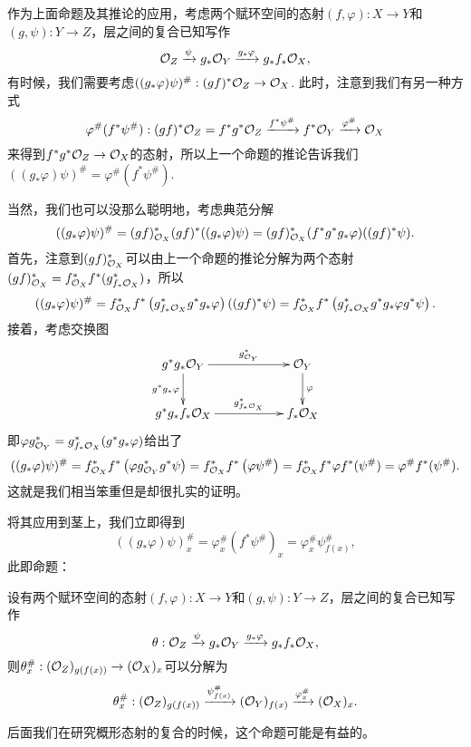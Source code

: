 \begin{para}
	作为上面命题及其推论的应用，考虑两个赋环空间的态射$(f,\varphi):X\to Y$和$(g,\psi):Y\to Z$，层之间的复合已知写作
	\[
		\mathcal{O}_Z\xrightarrow{\psi} g_*\mathcal{O}_Y\xrightarrow{g_*\varphi} g_*f_*\mathcal{O}_X,
	\]
	有时候，我们需要考虑$((g_*\varphi)\psi)^\#:(gf)^*\mathcal{O}_Z\to \mathcal{O}_X$. 此时，注意到我们有另一种方式
	\[
		\varphi^\#(f^*\psi^\#):(gf)^*\mathcal{O}_Z=f^*g^*\mathcal{O}_Z\xrightarrow{f^*\psi^\#}f^*\mathcal{O}_Y\xrightarrow{\varphi^\#}\mathcal{O}_X
	\]
	来得到$f^*g^*\mathcal{O}_Z\to \mathcal{O}_X$的态射，所以上一个命题的推论告诉我们$((g_*\varphi)\psi)^\#=\varphi^\#(f^*\psi^\#)$. 

	当然，我们也可以没那么聪明地，考虑典范分解
	\[
		((g_*\varphi)\psi)^\#=(gf)^*_{\mathcal{O}_X} (gf)^*((g_*\varphi)\psi)=(gf)^*_{\mathcal{O}_X} (f^*g^*g_*\varphi)((gf)^*\psi).
	\]
	首先，注意到$(gf)^*_{\mathcal{O}_X}$可以由上一个命题的推论分解为两个态射$(gf)^*_{\mathcal{O}_X}=f_{\mathcal{O}_X}^* f^*(g_{f_*\mathcal{O}_X}^*)$，所以
	\[
		((g_*\varphi)\psi)^\#=f_{\mathcal{O}_X}^* f^* \left(g_{f_*\mathcal{O}_X}^* g^*g_*\varphi\right)((gf)^*\psi)=f_{\mathcal{O}_X}^* f^* \left(g_{f_*\mathcal{O}_X}^* g^*g_*\varphi g^*\psi\right).
	\]
	接着，考虑交换图
	\[
		\xymatrix{
			g^*g_*\oo_Y \ar[d]_{g^*g_*\varphi}\ar[rr]^-{g_{\oo_Y}^*}&&\oo_Y\ar[d]^\varphi\\
			g^*g_*f_*\oo_X\ar[rr]^-{g_{f_*\oo_X}^*}&&f_*\oo_X
		}
	\]
	即$\varphi g_{\mathcal{O}_Y}^*=g_{f_*\mathcal{O}_X}^*(g^*g_*\varphi)$给出了
	\[
		((g_*\varphi)\psi)^\#=f_{\mathcal{O}_X}^* f^* \left(\varphi g_{\mathcal{O}_Y}^* g^*\psi\right)=f_{\mathcal{O}_X}^* f^* \left(\varphi \psi^\#\right)=f_{\mathcal{O}_X}^* f^* \varphi f^*(\psi^\#)=\varphi^\# f^*(\psi^\#).
	\]
	这就是我们相当笨重但是却很扎实的证明。
\end{para}

将其应用到茎上，我们立即得到
\[
	((g_*\varphi)\psi)^\#_x=\varphi^\#_x(f^*\psi^\#)_x=\varphi^\#_x \psi^\#_{f(x)},
\]
此即命题：

\begin{pro}\label{pro:morcom}
	设有两个赋环空间的态射$(f,\varphi):X\to Y$和$(g,\psi):Y\to Z$，层之间的复合已知写作
	\[
		\theta:\mathcal{O}_Z\xrightarrow{\psi} g_*\mathcal{O}_Y\xrightarrow{g_*\varphi} g_*f_*\mathcal{O}_X,
	\]
	则$\theta^\#_x:(\mathcal{O}_Z)_{g(f(x))}\to (\mathcal{O}_X)_x$可以分解为
	\[
		\theta^\#_x:(\mathcal{O}_Z)_{g(f(x))}\xrightarrow{\psi^\#_{f(x)}}(\mathcal{O}_Y)_{f(x)}\xrightarrow{\varphi^\#_x} (\mathcal{O}_X)_x.
	\]
\end{pro}

后面我们在研究概形态射的复合的时候，这个命题可能是有益的。

